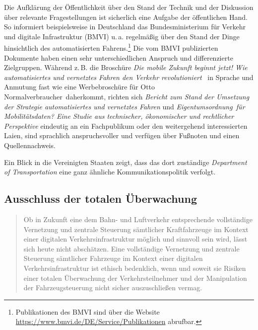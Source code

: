 \documentclass[twoside,a4paper,12pt]{article}
\begin{document}
Die Aufklärung der Öffentlichkeit über den Stand der Technik und der Diskussion über relevante Fragestellungen ist sicherlich eine Aufgabe der öffentlichen
Hand. 
So informiert beispielsweise in Deutschland das Bundesministerium für Verkehr und digitale Infrastruktur (BMVI) u.\,a. regelmäßig über den Stand der Dinge hinsichtlich
des automatisierten Fahrens.\footnote{Publikationen des BMVI sind über die Website \url{https://www.bmvi.de/DE/Service/Publikationen} abrufbar.} Die vom
BMVI publizierten Dokumente haben einen sehr unterschiedlichen Anspruch und differenzierte Zielgruppen. Während z.\,B. die Broschüre \textit{Die mobile 
Zukunft beginnt jetzt! Wie automatisiertes und vernetztes Fahren den Verkehr revolutioniert}~\cite{bmvi3} in Sprache und Anmutung fast wie eine Werbebroschüre 
für \glqq Otto Normalverbraucher\grqq\ daherkommt, richten sich \textit{Bericht zum Stand der Umsetzung der Strategie automatisiertes und vernetztes 
Fahren} und \textit{\glqq Eigentumsordnung\grqq\ für Mobilitätsdaten? Eine Studie aus technischer, ökonomischer und rechtlicher Perspektive} eindeutig an ein
Fachpublikum oder den weitergehend interessierten Laien, sind sprachlich anspruchsvoller und verfügen über Fußnoten und einen Quellennachweis.

Ein Blick in die Vereinigten Staaten zeigt, dass das dort zuständige \textit{Department of Transportation} eine ganz ähnliche Kommunikationspolitik
verfolgt.~\cite{dot}

\subsection{Ausschluss der totalen Überwachung} \label{AusschlussDerTotalenUeberwachung}

\begin{quote}
\glqq
Ob in Zukunft eine dem Bahn- und Luftverkehr entsprechende vollständige Vernetzung
und zentrale Steuerung sämtlicher Kraftfahrzeuge im Kontext einer digitalen Verkehrsinfrastruktur möglich und sinnvoll sein wird, 
lässt sich heute nicht abschätzen. Eine vollständige Vernetzung und zentrale Steuerung sämtlicher Fahrzeuge im Kontext einer 
digitalen Verkehrsinfrastruktur ist ethisch bedenklich, wenn und soweit sie Risiken einer totalen Überwachung der Verkehrsteilnehmer 
und der Manipulation der Fahrzeugsteuerung nicht sicher auszuschließen vermag.\grqq\mbox{~\cite[S. 12]{ek}}
\end{quote}
\end{document}
